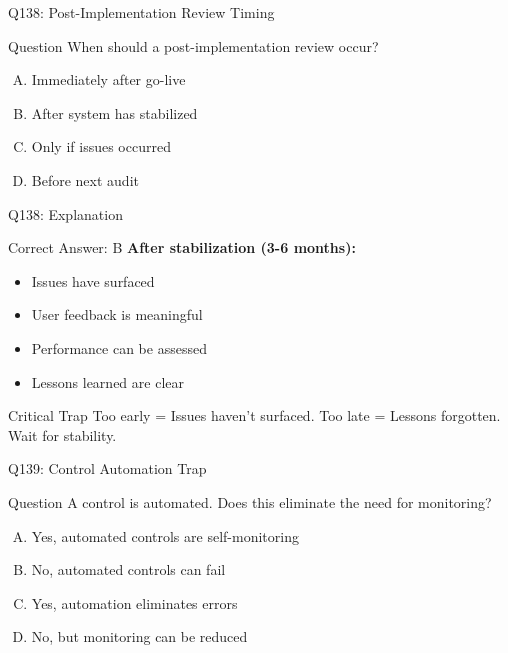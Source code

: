 \documentclass{beamer}
\begin{document}
	\begin{frame}{Q138: Post-Implementation Review Timing}
		\begin{block}{Question}
			When should a post-implementation review occur?
		\end{block}
		\begin{enumerate}[(A)]
			\item Immediately after go-live
			\item After system has stabilized
			\item Only if issues occurred
			\item Before next audit
		\end{enumerate}
	\end{frame}
	
	\begin{frame}{Q138: Explanation}
		\begin{block}{Correct Answer: B}
			\textbf{After stabilization (3-6 months):}
			\begin{itemize}
				\item Issues have surfaced
				\item User feedback is meaningful
				\item Performance can be assessed
				\item Lessons learned are clear
			\end{itemize}
		\end{block}
		\begin{alertblock}{Critical Trap}
			Too early = Issues haven't surfaced.
			Too late = Lessons forgotten.
			Wait for stability.
		\end{alertblock}
	\end{frame}
	
	\begin{frame}{Q139: Control Automation Trap}
		\begin{block}{Question}
			A control is automated. Does this eliminate the need for monitoring?
		\end{block}
		\begin{enumerate}[(A)]
			\item Yes, automated controls are self-monitoring
			\item No, automated controls can fail
			\item Yes, automation eliminates errors
			\item No, but monitoring can be reduced
		\end{enumerate}
	\end{frame}
	
\end{document}
